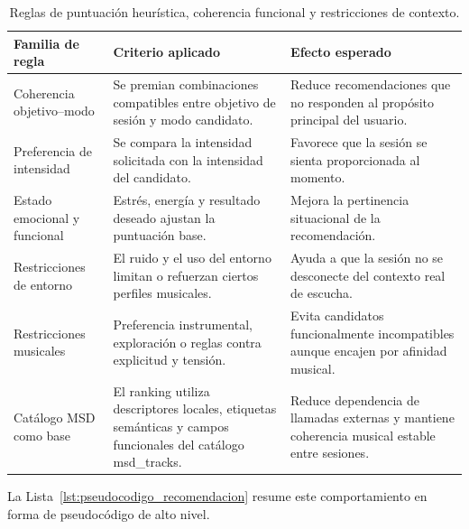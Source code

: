 \begin{table}[H]
\centering
\small
\renewcommand{\arraystretch}{1.1}
\begin{tabularx}{\textwidth}{|P{3.1cm}|Y|Y|}
\hline
\textbf{Familia de regla} & \textbf{Criterio aplicado} & \textbf{Efecto esperado} \\
\hline
Coherencia objetivo--modo & Se premian combinaciones compatibles entre objetivo de sesión y modo candidato. & Reduce recomendaciones que no responden al propósito principal del usuario. \\
\hline
Preferencia de intensidad & Se compara la intensidad solicitada con la intensidad del candidato. & Favorece que la sesión se sienta proporcionada al momento. \\
\hline
Estado emocional y funcional & Estrés, energía y resultado deseado ajustan la puntuación base. & Mejora la pertinencia situacional de la recomendación. \\
\hline
Restricciones de entorno & El ruido y el uso del entorno limitan o refuerzan ciertos perfiles musicales. & Ayuda a que la sesión no se desconecte del contexto real de escucha. \\
\hline
Restricciones musicales & Preferencia instrumental, exploración o reglas contra explicitud y tensión. & Evita candidatos funcionalmente incompatibles aunque encajen por afinidad musical. \\
\hline
Catálogo MSD como base & El ranking utiliza descriptores locales, etiquetas semánticas y campos funcionales del catálogo msd\_tracks. & Reduce dependencia de llamadas externas y mantiene coherencia musical estable entre sesiones. \\
\hline
\end{tabularx}
\caption{Reglas de puntuación heurística, coherencia funcional y restricciones de contexto.}
\label{tab:heuristica_contexto}
\end{table}

La Lista~\ref{lst:pseudocodigo_recomendacion} resume este comportamiento en
forma de pseudocódigo de alto nivel.


